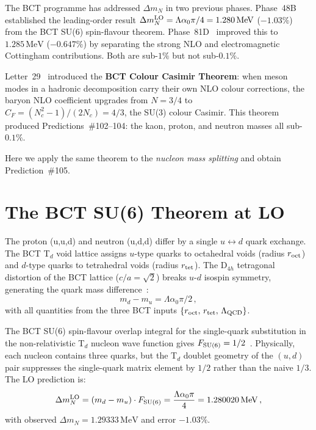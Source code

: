 \documentclass[twocolumn,10pt,a4paper]{article}
\begin{document}
The BCT programme has addressed $\Delta m_N$ in two previous phases.
Phase~48B~\cite{monograph} established the leading-order result
$\Delta m_N^{\rm LO} = \Lambda\alpha_0\pi/4 = 1.280\,\mathrm{MeV}$ ($-1.03\%$)
from the BCT SU(6) spin-flavour theorem.
Phase~81D~\cite{monograph} improved this to $1.285\,\mathrm{MeV}$
($-0.647\%$) by separating the strong NLO and electromagnetic Cottingham
contributions.  Both are sub-$1\%$ but not sub-$0.1\%$.

Letter~29~\cite{letter29} introduced the \textbf{BCT Colour Casimir Theorem}:
when meson modes in a hadronic decomposition carry their own NLO colour
corrections, the baryon NLO coefficient upgrades from $N = 3/4$ to
$C_F = (N_c^2-1)/(2N_c) = 4/3$, the SU(3) colour Casimir.  This theorem
produced Predictions~\#102--104: the kaon, proton, and neutron masses all
sub-$0.1\%$.

Here we apply the same theorem to the \emph{nucleon mass splitting} and obtain
Prediction~\#105.

\section{The BCT SU(6) Theorem at LO}

The proton (u,u,d) and neutron (u,d,d) differ by a single $u \leftrightarrow d$
quark exchange.  The BCT T$_d$ void lattice assigns $u$-type quarks to
octahedral voids (radius $r_{\rm oct}$) and $d$-type quarks to tetrahedral
voids (radius $r_{\rm tet}$).  The D$_{4h}$ tetragonal distortion of the BCT
lattice ($c/a = \sqrt{2}$) breaks $u$-$d$ isospin symmetry, generating the
quark mass difference~\cite{monograph}:
\begin{equation}
  \label{eq:mu_md}
  m_d - m_u = \Lambda\alpha_0\pi/2\,,
\end{equation}
with all quantities from the three BCT inputs
$\{r_{\rm oct},\,r_{\rm tet},\,\Lambda_{\rm QCD}\}$.

The BCT SU(6) spin-flavour overlap integral for the single-quark substitution
in the non-relativistic T$_d$ nucleon wave function gives
$F_{\rm SU(6)} = 1/2$~\cite{monograph}.  Physically, each nucleon contains three
quarks, but the T$_d$ doublet geometry of the $(u,d)$ pair suppresses the
single-quark matrix element by $1/2$ rather than the naive $1/3$.
The LO prediction is:
\begin{equation}
  \label{eq:dm_LO}
  \Delta m_N^{\rm LO} = (m_d - m_u)\cdot F_{\rm SU(6)}
  = \frac{\Lambda\alpha_0\pi}{4}
  = 1.280020\,\mathrm{MeV}\,,
\end{equation}
with observed $\Delta m_N = 1.29333\,\mathrm{MeV}$ and error $-1.03\%$.
\end{document}
